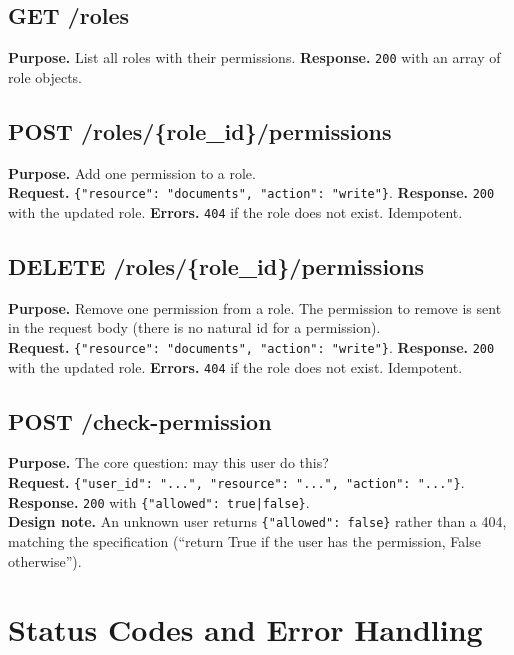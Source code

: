 \documentclass[11pt,a4paper]{report}
\begin{document}
\subsection*{GET /roles}
\textbf{Purpose.} List all roles with their permissions. \textbf{Response.}
\texttt{200} with an array of role objects.

\subsection*{POST /roles/\{role\_id\}/permissions}
\textbf{Purpose.} Add one permission to a role.\\
\textbf{Request.} \texttt{\{"resource": "documents", "action": "write"\}}.
\textbf{Response.} \texttt{200} with the updated role. \textbf{Errors.}
\texttt{404} if the role does not exist. Idempotent.

\subsection*{DELETE /roles/\{role\_id\}/permissions}
\textbf{Purpose.} Remove one permission from a role. The permission to remove is
sent in the request body (there is no natural id for a permission).\\
\textbf{Request.} \texttt{\{"resource": "documents", "action": "write"\}}.
\textbf{Response.} \texttt{200} with the updated role. \textbf{Errors.}
\texttt{404} if the role does not exist. Idempotent.

\subsection*{POST /check-permission}
\textbf{Purpose.} The core question: may this user do this?\\
\textbf{Request.} \texttt{\{"user\_id": "...", "resource": "...", "action":
"..."\}}. \textbf{Response.} \texttt{200} with \texttt{\{"allowed": true|false\}}.\\
\textbf{Design note.} An unknown user returns \texttt{\{"allowed": false\}}
rather than a 404, matching the specification (``return True if the user has the
permission, False otherwise'').

\section{Status Codes and Error Handling}
\end{document}
